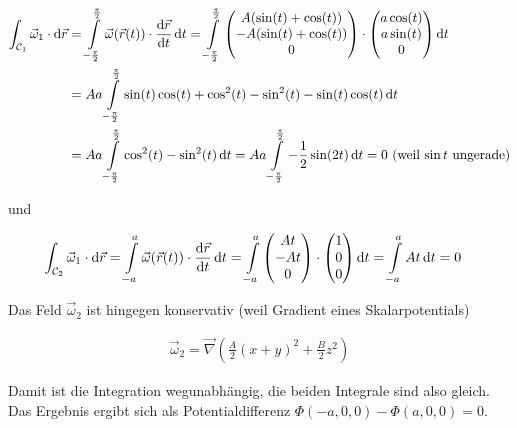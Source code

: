 \documentclass[a4paper,german,12pt,smallheadings]{scrartcl}
\begin{document}
\begin{align*}
  \int_{\mathcal{C}_1} \vec{\omega}_1 \cdot \dif\vec{r}
  &= \int\limits_{-\frac{\pi}{2}}^{\frac{\pi}{2}} \vec{\omega}(\vec{r}(t)) \cdot \frac{\dif\vec{r}}{\dif t} \dif t
  = \int\limits_{-\frac{\pi}{2}}^{\frac{\pi}{2}} \begin{pmatrix} A(\sin(t) + \cos(t)) \\ -A(\sin(t) + \cos(t)) \\ 0 \end{pmatrix} \cdot \begin{pmatrix} a\cos(t) \\ a\sin(t) \\ 0 \end{pmatrix} \dif t \\
  &= Aa \int\limits_{-\frac{\pi}{2}}^{\frac{\pi}{2}} \sin(t)\cos(t) + \cos^2(t) - \sin^2(t) - \sin(t)\cos(t) \dif t \\
  &= Aa \int\limits_{-\frac{\pi}{2}}^{\frac{\pi}{2}} \cos^2(t) - \sin^2(t) \dif t
   = Aa \int\limits_{-\frac{\pi}{2}}^{\frac{\pi}{2}} -\frac{1}{2} \sin(2t) \dif t
   = 0 \text{ (weil $\sin t$ ungerade)}
\end{align*}

und

\begin{align*}
  \int_{\mathcal{C}_2} \vec{\omega}_1 \cdot \dif\vec{r}
  &= \int\limits_{-a}^{a} \vec{\omega}(\vec{r}(t)) \cdot \frac{\dif\vec{r}}{\dif t} \dif t
  = \int\limits_{-a}^{a} \begin{pmatrix} At \\ -At \\ 0  \end{pmatrix} \cdot \begin{pmatrix} 1 \\ 0 \\ 0\end{pmatrix} \dif t
  = \int\limits_{-a}^{a} At \dif t = 0
\end{align*}

Das Feld $\vec{\omega}_2$ ist hingegen konservativ (weil Gradient eines Skalarpotentials)

\begin{align*}
  \vec{\omega}_2 = \vec{\nabla} \left( \frac{A}{2} (x+y)^2 + \frac{B}{2} z^2 \right)
\end{align*}

Damit ist die Integration wegunabhängig, die beiden Integrale sind also gleich.
Das Ergebnis ergibt sich als Potentialdifferenz $\Phi(-a, 0, 0) - \Phi(a, 0, 0)
= 0$.
\end{document}
